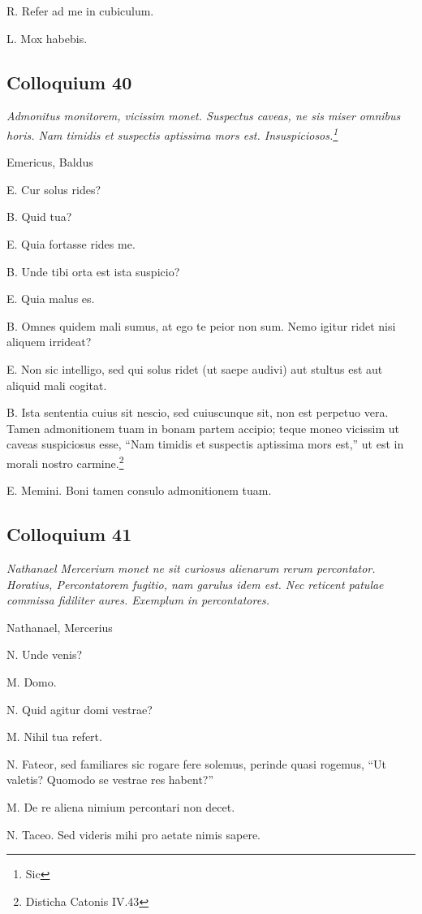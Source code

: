 \documentclass{article}
\begin{document}
R. Refer ad me in cubiculum. 

L. Mox habebis. 

\subsection{Colloquium 40}
\emph{Admonitus monitorem, vicissim monet. Suspectus caveas, ne sis miser omnibus horis. Nam timidis et suspectis aptissima mors est. Insuspiciosos.\footnote{Sic}}

Emericus, Baldus

E. Cur solus rides?

B. Quid tua?

E. Quia fortasse rides me. 

B. Unde tibi orta est ista suspicio?

E. Quia malus es. 

B. Omnes quidem mali sumus, at ego te peior non sum. Nemo igitur ridet nisi aliquem irrideat?

E. Non sic intelligo, sed qui solus ridet (ut saepe audivi) aut stultus est aut aliquid mali cogitat. 

B. Ista sententia cuius sit nescio, sed cuiuscunque sit, non est perpetuo vera. Tamen admonitionem tuam in bonam partem accipio; teque moneo vicissim ut caveas suspiciosus esse, ``Nam timidis et suspectis aptissima mors est,'' ut est in morali nostro carmine.\footnote{Disticha Catonis IV.43}

E. Memini. Boni tamen consulo admonitionem tuam.

\subsection{Colloquium 41}
\emph{Nathanael Mercerium monet ne sit curiosus alienarum rerum percontator. Horatius, Percontatorem fugitio, nam garulus idem est. Nec reticent patulae commissa fidiliter aures. Exemplum in percontatores.}

Nathanael, Mercerius

N. Unde venis?

M. Domo. 

N. Quid agitur domi vestrae?

M. Nihil tua refert. 

N. Fateor, sed familiares sic rogare fere solemus, perinde quasi rogemus, ``Ut valetis? Quomodo se vestrae res habent?''

M. De re aliena nimium percontari non decet. 

N. Taceo. Sed videris mihi pro aetate nimis sapere. 
\end{document}
